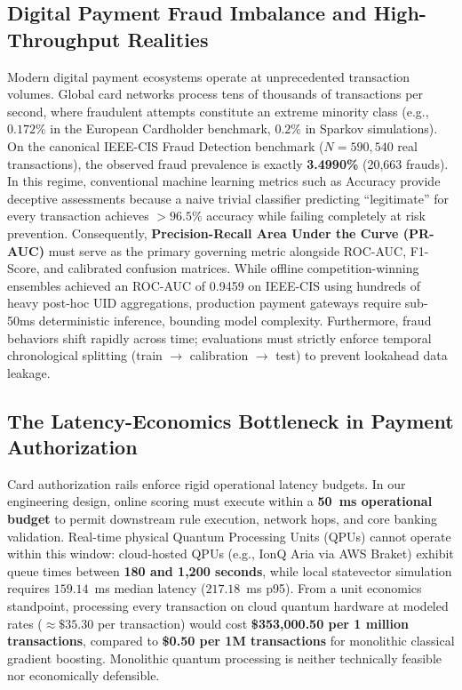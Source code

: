 \documentclass[10pt,a4paper]{article}
\begin{document}
\subsection{Digital Payment Fraud Imbalance and High-Throughput Realities}
Modern digital payment ecosystems operate at unprecedented transaction volumes. Global card networks process tens of thousands of transactions per second, where fraudulent attempts constitute an extreme minority class (e.g., $0.172\%$ in the European Cardholder benchmark, $0.2\%$ in Sparkov simulations). On the canonical IEEE-CIS Fraud Detection benchmark ($N=590,540$ real transactions), the observed fraud prevalence is exactly \textbf{3.4990\%} (20,663 frauds). 
In this regime, conventional machine learning metrics such as Accuracy provide deceptive assessments because a naive trivial classifier predicting ``legitimate'' for every transaction achieves $>96.5\%$ accuracy while failing completely at risk prevention. Consequently, \textbf{Precision-Recall Area Under the Curve (PR-AUC)} must serve as the primary governing metric alongside ROC-AUC, F1-Score, and calibrated confusion matrices. While offline competition-winning ensembles achieved an ROC-AUC of 0.9459 on IEEE-CIS using hundreds of heavy post-hoc UID aggregations, production payment gateways require sub-50ms deterministic inference, bounding model complexity. Furthermore, fraud behaviors shift rapidly across time; evaluations must strictly enforce temporal chronological splitting (train $\rightarrow$ calibration $\rightarrow$ test) to prevent lookahead data leakage.

\subsection{The Latency-Economics Bottleneck in Payment Authorization}
Card authorization rails enforce rigid operational latency budgets. In our engineering design, online scoring must execute within a \textbf{50~ms operational budget} to permit downstream rule execution, network hops, and core banking validation. Real-time physical Quantum Processing Units (QPUs) cannot operate within this window: cloud-hosted QPUs (e.g., IonQ Aria via AWS Braket) exhibit queue times between \textbf{180 and 1,200 seconds}, while local statevector simulation requires $159.14$~ms median latency ($217.18$~ms p95). 
From a unit economics standpoint, processing every transaction on cloud quantum hardware at modeled rates ($\approx \$35.30$ per transaction) would cost \textbf{\$353,000.50 per 1 million transactions}, compared to \textbf{\$0.50 per 1M transactions} for monolithic classical gradient boosting. Monolithic quantum processing is neither technically feasible nor economically defensible.
\end{document}
